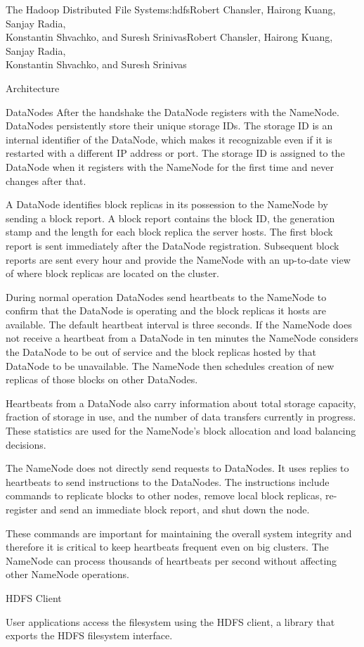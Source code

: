 \begin{aosachaptertoc}{The Hadoop Distributed File System}{s:hdfs}{Robert Chansler, Hairong Kuang, Sanjay Radia, \\ Konstantin Shvachko, and Suresh Srinivas}{Robert Chansler, Hairong Kuang, Sanjay Radia, \\ \hspace*{0.9cm} Konstantin Shvachko, and Suresh Srinivas}
\begin{aosasect1}{Architecture}
\begin{aosasect2}{DataNodes}
After the handshake the DataNode registers with the
NameNode. DataNodes persistently store their unique storage IDs. The
storage ID is an internal identifier of the DataNode, which makes it
recognizable even if it is restarted with a different IP address or
port. The storage ID is assigned to the DataNode when it registers
with the NameNode for the first time and never changes after that.

A DataNode identifies block replicas in its possession to the NameNode
by sending a block report. A block report contains the block ID, the
generation stamp and the length for each block replica the server
hosts. The first block report is sent immediately after the DataNode
registration. Subsequent block reports are sent every hour and provide
the NameNode with an up-to-date view of where block replicas are
located on the cluster.

During normal operation DataNodes send heartbeats to the NameNode to
confirm that the DataNode is operating and the block replicas it hosts
are available. The default heartbeat interval is three seconds. If the
NameNode does not receive a heartbeat from a DataNode in ten minutes
the NameNode considers the DataNode to be out of service and the block
replicas hosted by that DataNode to be unavailable. The NameNode then
schedules creation of new replicas of those blocks on other DataNodes.

Heartbeats from a DataNode also carry information about total storage
capacity, fraction of storage in use, and the number of data transfers
currently in progress. These statistics are used for the NameNode's
block allocation and load balancing decisions.

The NameNode does not directly send requests to DataNodes. It uses
replies to heartbeats to send instructions to the DataNodes.  The
instructions include commands to replicate blocks to other nodes,
remove local block replicas, re-register and send an immediate block
report, and shut down the node.

These commands are important for maintaining the overall system
integrity and therefore it is critical to keep heartbeats frequent
even on big clusters. The NameNode can process thousands of heartbeats
per second without affecting other NameNode operations.

\end{aosasect2}

\begin{aosasect2}{HDFS Client}

User applications access the filesystem using the HDFS client, a
library that exports the HDFS filesystem interface.


\end{aosasect2}
\end{aosasect1}
\end{aosachaptertoc}
